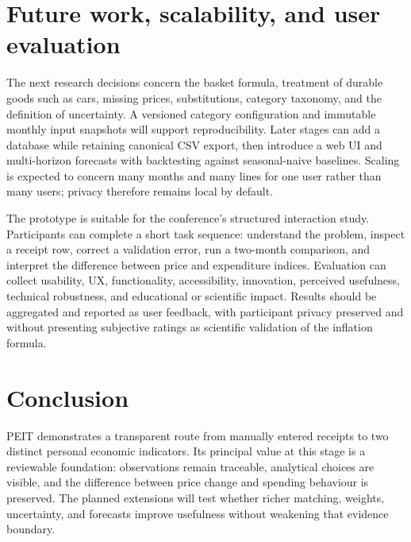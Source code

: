 \documentclass[10pt,a4paper]{article}
\newcommand{\chapter}[1]{
  \section{#1}
}
\begin{document}
\chapter{Future work, scalability, and user evaluation}
The next research decisions concern the basket formula, treatment of durable
goods such as cars, missing prices, substitutions, category taxonomy, and the
definition of uncertainty. A versioned category configuration and immutable
monthly input snapshots will support reproducibility. Later stages can add a
database while retaining canonical CSV export, then introduce a web UI and
multi-horizon forecasts with backtesting against seasonal-naive baselines.
Scaling is expected to concern many months and many lines for one user rather
than many users; privacy therefore remains local by default.

The prototype is suitable for the conference's structured interaction study.
Participants can complete a short task sequence: understand the problem,
inspect a receipt row, correct a validation error, run a two-month comparison,
and interpret the difference between price and expenditure indices. Evaluation
can collect usability, UX, functionality, accessibility, innovation,
perceived usefulness, technical robustness, and educational or scientific
impact. Results should be aggregated and reported as user feedback, with
participant privacy preserved and without presenting subjective ratings as
scientific validation of the inflation formula.

\chapter{Conclusion}
PEIT demonstrates a transparent route from manually entered receipts to two
distinct personal economic indicators. Its principal value at this stage is a
reviewable foundation: observations remain traceable, analytical choices are
visible, and the difference between price change and spending behaviour is
preserved. The planned extensions will test whether richer matching, weights,
uncertainty, and forecasts improve usefulness without weakening that evidence
boundary.
\end{document}
